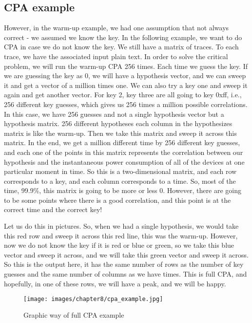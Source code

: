 \subsection{CPA example}\label{c8_CPA_example:subsec}

However, in the warm-up example, we had one assumption that not always correct -
we assumed we know the key. In the following example, we want to do CPA in case
we do not know the key. We still have a matrix of traces. To each trace, we have
the associated input plain text. In order to solve the critical problem, we will run
the warm-up CPA 256 times. Each time we guess the key. If we are guessing the
key as 0, we will have a hypothesis vector, and we can sweep it and get a vector
of a million times one. We can also try a key one and sweep it again and get another
vector. For key 2, key three are all going to key 0xff, i.e., 256 different key
guesses, which gives us 256 times a million possible correlations. In this case,
we have 256 guesses and not a single hypothesis vector but a hypothesis matrix.
256 different hypotheses each column in the hypothesizes matrix is like the
warm-up. Then we take this matrix and sweep it across this matrix. In the end, we
get a million different time by 256 different key guesses, and each one of the
points in this matrix represents the correlation between our hypothesis and the
instantaneous power consumption of all of the devices at one particular moment
in time. So this is a two-dimensional matrix, and each row corresponds to a key, and each column corresponds to a time. So, most of the time, 99.9\%, this
matrix is going to be more or less 0. However, there are going to be some points where
there is a good correlation, and this point is at the correct time and the
correct key!

Let us do this in pictures. So, when we had a single hypothesis, we would take
this red row and sweep it across this red line, this was the warm-up. However, now
we do not know the key if it is red or blue or green, so we take this blue vector
and sweep it across, and we will take this green vector and sweep it across. So
this is the output here, it has the same number of rows as the number of key
guesses and the same number of columns as we have times. This is full CPA, and
hopefully, in one of these rows, we will have a peak, and we will be happy. 

\begin{figure}[!ht]
    \centering
    \texttt{[image: images/chapter8/cpa\_example.jpg]}
    \caption{Graphic way of full CPA example} \label{c8_cpa_example:fig}
\end{figure}

